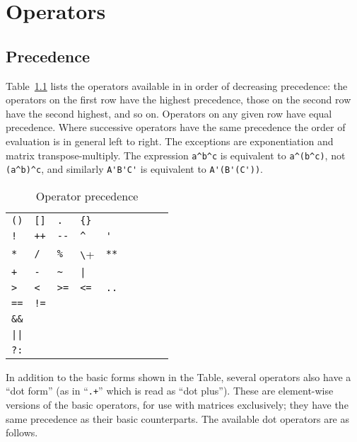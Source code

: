 \chapter{Operators}
\label{chap:operators}

\section{Precedence}

Table~\ref{tab:ops} lists the operators available in  in
order of decreasing precedence: the operators on the first row have
the highest precedence, those on the second row have the second
highest, and so on. Operators on any given row have equal
precedence. Where successive operators have the same precedence the
order of evaluation is in general left to right. The exceptions are
exponentiation and matrix transpose-multiply. The expression
\verb|a^b^c| is equivalent to \verb|a^(b^c)|, not \verb|(a^b)^c|, 
and similarly \verb|A'B'C'| is equivalent to \verb|A'(B'(C'))|.

\begin{table}[htbp]
\caption{Operator precedence}
\label{tab:ops}
\begin{center}
\begin{tabular}{lllllllll}
\verb|()| & \verb|[]| & \texttt{.} & \verb|{}| \\
\texttt{!} & \texttt{++} & \verb|--| & \verb|^| & \verb|'| \\
\texttt{*} & \texttt{/} & \texttt{\%} & \verb+\+ & \texttt{**} \\
\texttt{+} & \texttt{-} & \verb|~| & \verb+|+ & \\
\verb|>| & \verb|<| & \verb|>=| & \verb|<=| & \texttt{..} \\
\texttt{==} & \texttt{!=} \\
\verb|&&| \\
\verb+||+ \\
\texttt{?:} \\
\end{tabular}
\end{center}
\end{table}

In addition to the basic forms shown in the Table, several operators
also have a ``dot form'' (as in ``\texttt{.+}'' which is read as ``dot
plus''). These are element-wise versions of the basic operators, for
use with matrices exclusively; they have the same precedence as their
basic counterparts. The available dot operators are as follows.

